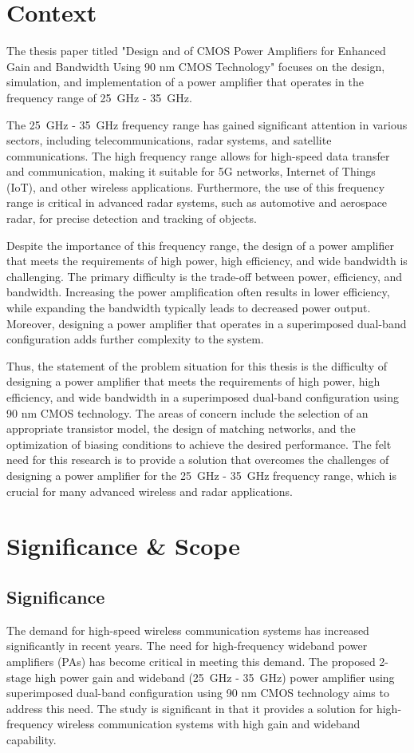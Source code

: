 \section{Context}
The thesis paper titled "Design and of CMOS Power Amplifiers for Enhanced Gain and Bandwidth Using 90 nm CMOS Technology" focuses on the design, simulation, and implementation of a power amplifier that operates in the frequency range of \SI{25}{\giga\hertz} - \SI{35}{\giga\hertz}.

The \SI{25}{\giga\hertz} - \SI{35}{\giga\hertz} frequency range has gained significant attention in various sectors,
including telecommunications, radar systems, and satellite communications. The high frequency range allows for high-speed data transfer and communication, making it suitable
for 5G networks, Internet of Things (IoT), and other wireless applications. Furthermore, the
use of this frequency range is critical in advanced radar systems, such as automotive and
aerospace radar, for precise detection and tracking of objects.

Despite the importance of this frequency range, the design of a power amplifier that meets the
requirements of high power, high efficiency, and wide bandwidth is challenging. The primary
difficulty is the trade-off between power, efficiency, and bandwidth. Increasing the power
amplification often results in lower efficiency, while expanding the bandwidth typically leads
to decreased power output. Moreover, designing a power amplifier that operates in a
superimposed dual-band configuration adds further complexity to the system.

Thus, the statement of the problem situation for this thesis is the difficulty of designing a
power amplifier that meets the requirements of high power, high efficiency, and wide
bandwidth in a superimposed dual-band configuration using 90 nm CMOS technology. The
areas of concern include the selection of an appropriate transistor model, the design of
matching networks, and the optimization of biasing conditions to achieve the desired
performance. The felt need for this research is to provide a solution that overcomes the
challenges of designing a power amplifier for the \SI{25}{\giga\hertz} - \SI{35}{\giga\hertz} frequency range, which is
crucial for many advanced wireless and radar applications.

\section{Significance \& Scope}
\subsection{Significance}
The demand for high-speed wireless communication systems has increased significantly in
recent years. The need for high-frequency wideband power amplifiers (PAs) has become
critical in meeting this demand. The proposed 2-stage high power gain and wideband
(\SI{25}{\giga\hertz} - \SI{35}{\giga\hertz}) power amplifier using superimposed dual-band configuration using 90 nm
CMOS technology aims to address this need. The study is significant in that it provides a
solution for high-frequency wireless communication systems with high gain and
wideband capability.

